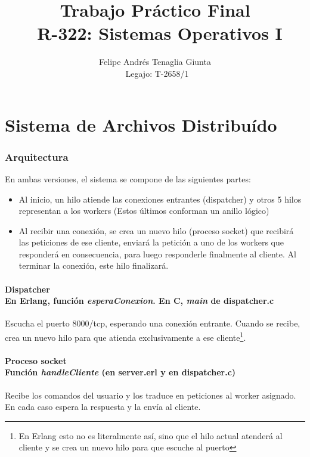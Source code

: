 \documentclass[a4paper, 11pt]{article}
\title{Trabajo Pr\'actico Final \\\ R-322: Sistemas Operativos I}
\author{Felipe Andr\'es Tenaglia Giunta \\\ Legajo: T-2658/1}
\begin{document}
\maketitle
\newpage
\part*{Sistema de Archivos Distribu\'ido}

\section*{Arquitectura}
En ambas versiones, el sistema se compone de las siguientes partes:
\begin{itemize}

\item Al inicio, un hilo atiende las conexiones entrantes (dispatcher) y otros 5 hilos
representan a los workers (Estos últimos conforman un anillo lógico)

\item Al recibir una conexión, se crea un nuevo hilo (proceso socket) que recibirá las peticiones de ese cliente, enviará la petición a uno de los workers que responderá en consecuencia, para luego responderle finalmente al cliente.
Al terminar la conexión, este hilo finalizará.
\end{itemize}

\subsection*{Dispatcher\\ {\small En Erlang, función \textit{esperaConexion}. En C, \textit{main} de dispatcher.c}} 

Escucha el puerto 8000/tcp, esperando una conexión entrante. Cuando se recibe, crea un nuevo hilo para que atienda exclusivamente a ese cliente\footnote{En Erlang esto no es literalmente así, sino que el hilo actual atenderá al cliente y se crea un nuevo hilo para que escuche al puerto}.

\subsection*{Proceso socket\\ {\small Función \textit{handleCliente} (en server.erl y en dispatcher.c)}}

Recibe los comandos del usuario y los traduce en peticiones al worker asignado. En cada caso espera la respuesta y la envía al cliente. \\
\end{document}
